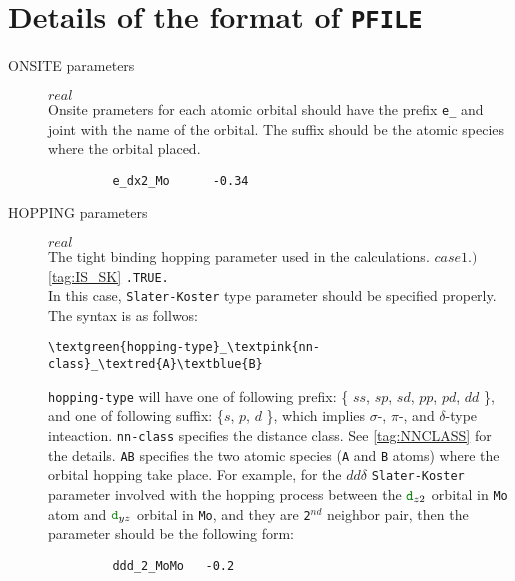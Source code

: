 \documentclass[a4paper,12pt]{scrartcl}
\makeatletter
\def\namedlabel#1#2{\begingroup
    #2%
    \def\@currentlabel{#2}%
    \phantomsection\label{#1}\endgroup
}
\newcommand{\textred}[1]{\textcolor{red!85!white}{\texttt{#1}}}
\newcommand{\textblue}[1]{\textcolor{blue!85!white}{\texttt{#1}}}
\newcommand{\textgreen}[1]{\textcolor{green!50!black}{\texttt{#1}}}
\newcommand{\textpink}[1]{\textcolor{red!60!yellow}{\texttt{#1}}}
\makeatother
\begin{document}
\section{Details of the format of \texttt{PFILE}}\label{tag:PFILE-detail}
\begin{description}

    \item[\namedlabel{tag:param-onsite}{ONSITE parameters}] $real$ \\
		Onsite prameters for each atomic orbital should have the prefix
		\textgreen{e\_} and joint with the name of the orbital. The suffix
		should be the atomic species where the orbital placed.
        \begin{verbatim}
         e_dx2_Mo      -0.34
        \end{verbatim}

    \item[\namedlabel{tag:param-hopping}{HOPPING parameters}] $real$ \\
        The tight binding hopping parameter used in the calculations.
		\subitem $case 1.)$ \ref{tag:IS_SK} \texttt{.TRUE.} \\
		In this case, \texttt{Slater-Koster} type parameter should be
		specified properly. The syntax is as follwos:
        \begin{Verbatim}[commandchars=\\\{\}]
         \textgreen{hopping-type}_\textpink{nn-class}_\textred{A}\textblue{B}
        \end{Verbatim}
		\texttt{hopping-type} will have one of following prefix: \{ $ss$, $sp$, $sd$, $pp$, 
		$pd$, $dd$ \}, and one of following suffix: \{$s$, $p$, $d$ \}, which implies
		$\sigma$-, $\pi$-, and $\delta$-type inteaction.
		\textpink{nn-class} specifies the distance class. See \ref{tag:NNCLASS} for the 
		details.
		\textred{A}\textblue{B} specifies the two atomic species (\textred{A} and \textblue{B} atoms) 
		where the orbital hopping take place. 
		For example, for the $dd\delta$ \texttt{Slater-Koster} parameter involved with 
		the hopping process between the $\textgreen{d}_{z2}$ orbital in \textred{Mo} atom 
		and $\textgreen{d}_{yz}$ orbital in \textblue{Mo}, 
		and they are \textpink{2$^{nd}$} neighbor pair, then the parameter should be the following form:
        \begin{verbatim}
         ddd_2_MoMo   -0.2
        \end{verbatim}


\end{description}
\end{document}
